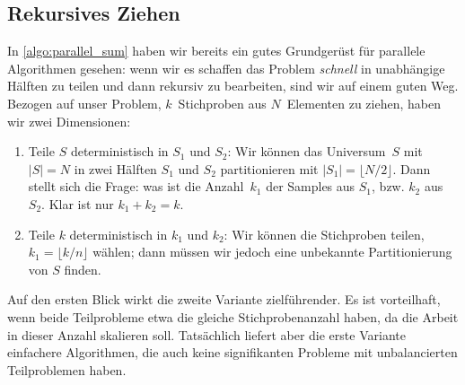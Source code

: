\subsection{Rekursives Ziehen}
In \cref{algo:parallel_sum} haben wir bereits ein gutes Grundgerüst für parallele Algorithmen gesehen:
wenn wir es schaffen das Problem \emph{schnell} in unabhängige Hälften zu teilen und dann rekursiv zu bearbeiten, sind wir auf einem guten Weg.
Bezogen auf unser Problem, $k$~Stichproben aus $N$~Elementen zu ziehen, haben wir zwei Dimensionen:
\begin{enumerate}
    \item Teile $S$ deterministisch in $S_1$ und $S_2$: Wir können das Universum~$S$ mit $|S| = N$ in zwei Hälften $S_1$ und $S_2$ partitionieren mit $|S_1| = \lfloor N / 2 \rfloor$.
          Dann stellt sich die Frage: was ist die Anzahl~$k_1$ der Samples aus $S_1$, bzw. $k_2$ aus $S_2$. Klar ist nur $k_1 + k_2 = k$.

    \item Teile $k$ deterministisch in $k_1$ und $k_2$: Wir können die Stichproben teilen, \dh $k_1 = \lfloor k/n \rfloor$ wählen; dann müssen wir jedoch eine unbekannte Partitionierung von $S$ finden.
\end{enumerate}

Auf den ersten Blick wirkt die zweite Variante zielführender.
Es ist vorteilhaft, wenn beide Teilprobleme etwa die gleiche Stichprobenanzahl haben, da die Arbeit in dieser Anzahl skalieren soll.
Tatsächlich liefert aber die erste Variante einfachere Algorithmen, die auch keine signifikanten Probleme mit unbalancierten Teilproblemen haben.

